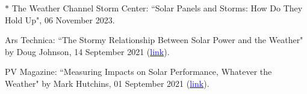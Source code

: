 \documentclass{article}[12pt]
\begin{document}
	
	\begin{etaremune}[]
		
		\item $\ast$ The Weather Channel Storm Center: ``Solar Panels and Storms: How Do They Hold Up", 06 November 2023.
		
		\item Ars Technica: ``The Stormy Relationship Between Solar Power and the Weather" by Doug Johnson, 14 September 2021 (\href{https://arstechnica.com/science/2021/09/the-stormy-relationship-between-solar-power-and-the-weather/}{\textcolor{blue}{link}}).
		
		\item  PV Magazine: ``Measuring Impacts on Solar Performance, Whatever the Weather" by Mark Hutchins, 01 September 2021 (\href{https://pv-magazine-usa.com/2021/09/01/measuring-impacts-on-solar-performance-whatever-the-weather/}{\textcolor{blue}{link}}).
		
		
		
		
		
		
		
		

\end{etaremune}
\end{document}
